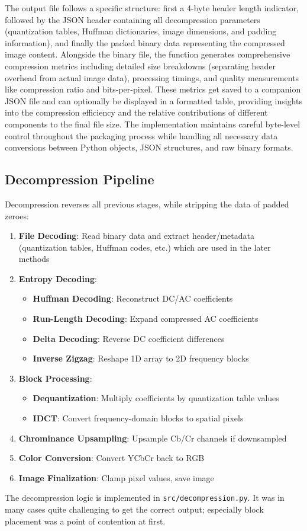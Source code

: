 The output file follows a specific structure: first a 4-byte header length indicator, followed by the JSON header containing all decompression parameters (quantization tables, Huffman dictionaries, image dimensions, and padding information), and finally the packed binary data representing the compressed image content. Alongside the binary file, the function generates comprehensive compression metrics including detailed size breakdowns (separating header overhead from actual image data), processing timings, and quality measurements like compression ratio and bits-per-pixel. These metrics get saved to a companion JSON file and can optionally be displayed in a formatted table, providing insights into the compression efficiency and the relative contributions of different components to the final file size. The implementation maintains careful byte-level control throughout the packaging process while handling all necessary data conversions between Python objects, JSON structures, and raw binary formats.
\subsection{Decompression Pipeline}
Decompression reverses all previous stages, while stripping the data of padded zeroes:
\begin{enumerate}
	\item \textbf{File Decoding}: Read binary data and extract header/metadata (quantization tables, Huffman codes, etc.) which are used in the later methods
	\item \textbf{Entropy Decoding}:
	\begin{itemize}
		\item \textbf{Huffman Decoding}: Reconstruct DC/AC coefficients
		\item \textbf{Run-Length Decoding}: Expand compressed AC coefficients
		\item \textbf{Delta Decoding}: Reverse DC coefficient differences
		\item \textbf{Inverse Zigzag}: Reshape 1D array to 2D frequency blocks
	\end{itemize}
	\item \textbf{Block Processing}:
	\begin{itemize}
		\item \textbf{Dequantization}: Multiply coefficients by quantization table values
		\item \textbf{IDCT}: Convert frequency-domain blocks to spatial pixels
	\end{itemize}
	\item \textbf{Chrominance Upsampling}: Upsample Cb/Cr channels if downsampled
	\item \textbf{Color Conversion}: Convert YCbCr back to RGB
	\item \textbf{Image Finalization}: Clamp pixel values, save image
\end{enumerate}
The decompression logic is implemented in \texttt{src/decompression.py}. It was in many cases quite challenging to get the correct output; especially block placement was a point of contention at first.

